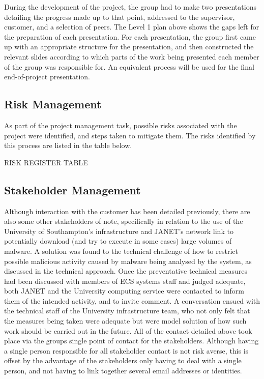 During the development of the project, the group had to make two presentations
detailing the progress made up to that point, addressed to the supervisor,
customer, and a selection of peers. The Level 1 plan above shows the gaps left
for the preparation of each presentation. For each presentation, the group first
came up with an appropriate structure for the presentation, and then constructed
the relevant slides according to which parts of the work being presented each
member of the group was responsible for. An equivalent process will be used for
the final end-of-project presentation.


\subsection{Risk Management}

As part of the project management task, possible risks associated with the
project were identified, and steps taken to mitigate them. The risks identified
by this process are listed in the table below.

RISK REGISTER TABLE


\subsection{Stakeholder Management}

Although interaction with the customer has been detailed previously, there are
also some other stakeholders of note, specifically in relation to the use of the
University of Southampton's infrastructure and JANET's network link to
potentially download (and try to execute in some cases) large volumes of
malware. A solution was found to the technical challenge of how to restrict
possible malicious activity caused by malware being analysed by the system, as
discussed in the technical approach. Once the preventative technical measures
had been discussed with members of ECS systems staff and judged adequate, both
JANET and the University computing service were contacted to inform them of the
intended activity, and to invite comment. A conversation ensued with the
technical staff of the University infrastructure team, who not only felt that
the measures being taken were adequate but were model solution of how such work
should be carried out in the future. All of the contact detailed above took
place via the groups single point of contact for the stakeholders. Although
having a single person responsible for all stakeholder contact is not risk
averse, this is offset by the advantage of the stakeholders only having to deal
with a single person, and not having to link together several email addresses or
identities.

